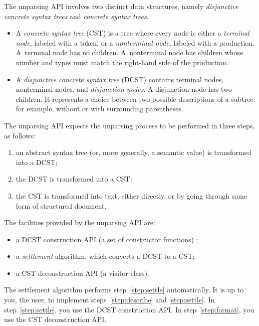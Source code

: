 The unparsing API involves two distinct data structures, namely
\emph{disjunctive concrete syntax trees}
and
\emph{concrete syntax trees}.
%
\begin{itemize}
\item
A \emph{concrete syntax tree} (CST) is
a tree where every node is either
a \emph{terminal node},
labeled with a token,
or
a \emph{nonterminal node},
labeled with a production.
%
A~terminal node has no children.
%
A~nonterminal node has children
whose number and types must match
the right-hand side of the production.
%
\item
A \emph{disjunctive concrete syntax tree} (DCST)
contains terminal nodes, nonterminal nodes,
and \emph{disjunction nodes}.
A disjunction node has two children.
It represents a choice between two possible descriptions of a subtree:
for example, without or with surrounding parentheses.
\end{itemize}
%
The unparsing API expects the unparsing process to be performed in three
steps, as follows:
%
\begin{enumerate}
\item \label{step:describe}
      an abstract syntax tree (or, more generally, a semantic value)
      is transformed into a DCST;
\item \label{step:settle}
      the DCST is transformed into a CST;
\item \label{step:format}
      the CST is transformed into text,
      either directly,
      or by going through some form of structured document.
\end{enumerate}


The facilities provided by the unparsing API are:
\begin{itemize}
\item
a DCST construction API (a set of constructor functions) ;
\item
a \emph{settlement} algorithm, which converts a DCST to a CST;
\item
a CST deconstruction API (a visitor class).
\end{itemize}

The settlement algorithm performs step~\ref{step:settle} automatically. It is
up to you, the user, to implement steps~\ref{step:describe} and
\ref{step:settle}.
In step~\ref{step:settle}, you use the DCST construction API.
In step~\ref{step:format}, you use the CST deconstruction API.


